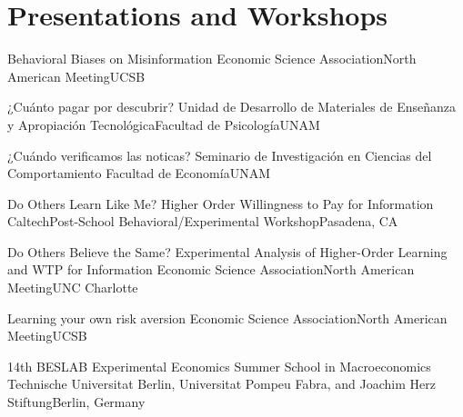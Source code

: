 \section{Presentations and Workshops}



{Behavioral Biases on Misinformation}
{Economic Science Association}{North American Meeting}{UCSB}{}

{¿Cuánto pagar por descubrir?}
{Unidad de Desarrollo de Materiales de Enseñanza y Apropiación Tecnológica}{Facultad de Psicología}{UNAM}{}

{¿Cuándo verificamos las noticas?}
{Seminario de Investigación en Ciencias del Comportamiento }{Facultad de Economía}{UNAM}{}

{Do Others Learn Like Me? Higher Order Willingness to Pay for Information}
{Caltech}{Post-School Behavioral/Experimental Workshop}{Pasadena, CA}{}


{Do Others Believe the Same? Experimental Analysis of Higher-Order Learning and WTP for Information}
{Economic Science Association}{North American Meeting}{UNC Charlotte}{}

{Learning your own risk aversion}
{Economic Science Association}{North American Meeting}{UCSB}{}

{14th BESLAB Experimental Economics Summer School in Macroeconomics}
{Technische Universitat Berlin, Universitat Pompeu Fabra, and Joachim Herz Stiftung}{}{Berlin, Germany}{}
